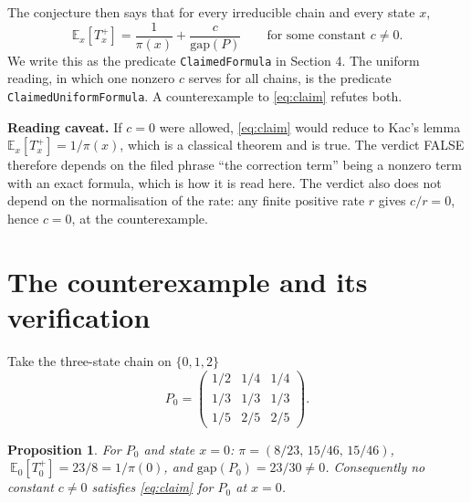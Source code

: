 \documentclass[11pt,a4paper]{article}
\newtheorem{proposition}{Proposition}
\begin{document}
The conjecture then says that for every irreducible chain and every state $x$,
\begin{equation}\label{eq:claim}
\mathbb{E}_x[T_x^+]=\frac{1}{\pi(x)}+\frac{c}{\mathrm{gap}(P)}\qquad\text{for some constant } c\neq 0 .
\end{equation}
We write this as the predicate \texttt{ClaimedFormula} in Section 4. The uniform reading, in which one nonzero $c$ serves for all chains, is the predicate \texttt{ClaimedUniformFormula}. A counterexample to \eqref{eq:claim} refutes both.

\medskip
\noindent\textbf{Reading caveat.} If $c=0$ were allowed, \eqref{eq:claim} would reduce to Kac's lemma $\mathbb{E}_x[T_x^+]=1/\pi(x)$, which is a classical theorem and is true. The verdict FALSE therefore depends on the filed phrase ``the correction term'' being a nonzero term with an exact formula, which is how it is read here. The verdict also does not depend on the normalisation of the rate: any finite positive rate $r$ gives $c/r=0$, hence $c=0$, at the counterexample.

\section{The counterexample and its verification}

Take the three-state chain on $\{0,1,2\}$
\[
P_0=\begin{pmatrix}1/2&1/4&1/4\\ 1/3&1/3&1/3\\ 1/5&2/5&2/5\end{pmatrix}.
\]

\begin{proposition}
For $P_0$ and state $x=0$: $\pi=(8/23,\,15/46,\,15/46)$, $\ \mathbb{E}_0[T_0^+]=23/8=1/\pi(0)$, and $\mathrm{gap}(P_0)=23/30\neq 0$. Consequently no constant $c\neq 0$ satisfies \eqref{eq:claim} for $P_0$ at $x=0$.
\end{proposition}
\end{document}
